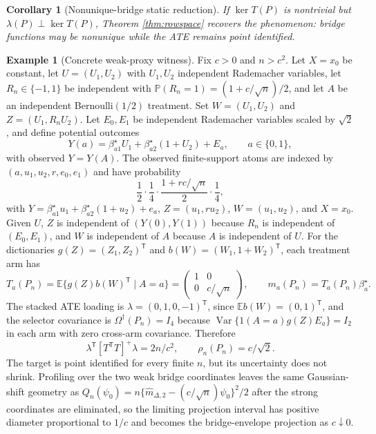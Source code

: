 \documentclass[11pt]{article}
\newcommand{\E}{\mathbb{E}}
\renewcommand{\Pr}{\mathbb{P}}
\newcommand{\transpose}{\mathsf{T}}
\theoremstyle{definition}
\newtheorem{example}{Example}
\theoremstyle{plain}
\newtheorem{corollary}{Corollary}
\theoremstyle{remark}
\begin{document}
\begin{corollary}[Nonunique-bridge static reduction]\label{cor:nonunique}
If $\ker T(P)$ is nontrivial but $\lambda(P)\perp\ker T(P)$, Theorem
\ref{thm:rowspace} recovers the \cite{ZhangLiMiaoTchetgen2023} phenomenon:
bridge functions may be nonunique while the ATE remains point identified.
\end{corollary}

\begin{example}[Concrete weak-proxy witness]\label{ex:witness}
Fix $c>0$ and $n>c^2$.  Let $X=x_0$ be constant, let
$U=(U_1,U_2)$ with $U_1,U_2$ independent Rademacher variables, let
$R_n\in\{-1,1\}$ be independent with
$\Pr(R_n=1)=(1+c/\sqrt n)/2$, and let $A$ be an independent Bernoulli$(1/2)$
treatment.  Set $W=(U_1,U_2)$ and $Z=(U_1,R_nU_2)$.  Let
$E_0,E_1$ be independent Rademacher variables scaled by $\sqrt 2$, and define
potential outcomes
\[
Y(a)=\beta_{a1}^\star U_1+\beta_{a2}^\star(1+U_2)+E_a,\qquad a\in\{0,1\},
\]
with observed $Y=Y(A)$.  The observed finite-support atoms are indexed by
$(a,u_1,u_2,r,e_0,e_1)$ and have probability
\[
\frac12\cdot\frac14\cdot\frac{1+r c/\sqrt n}{2}\cdot\frac14,
\]
with $Y=\beta_{a1}^\star u_1+\beta_{a2}^\star(1+u_2)+e_a$,
$Z=(u_1,ru_2)$, $W=(u_1,u_2)$, and $X=x_0$.
Given $U$, $Z$ is independent of $(Y(0),Y(1))$ because $R_n$ is independent of
$(E_0,E_1)$, and $W$ is independent of $A$ because $A$ is independent of $U$.
For the dictionaries $g(Z)=(Z_1,Z_2)^\transpose$ and
$b(W)=(W_1,1+W_2)^\transpose$, each treatment arm has
\[
T_a(P_n)=\E\{g(Z)b(W)^\transpose\mid A=a\}
=\begin{pmatrix}1&0\\0&c/\sqrt n\end{pmatrix},
\qquad
m_a(P_n)=T_a(P_n)\beta_a^\star .
\]
The stacked ATE loading is
$\lambda=(0,1,0,-1)^\transpose$, since
$\E b(W)=(0,1)^\transpose$, and the selector covariance is
$\Omega^\dagger(P_n)=I_4$ because
$\operatorname{Var}\{1(A=a)g(Z)E_a\}=I_2$ in each arm with zero cross-arm
covariance.  Therefore
\[
\lambda^\transpose[T^\transpose T]^+\lambda=2n/c^2,\qquad
\rho_n(P_n)=c/\sqrt2.
\]
The target is point identified for every finite $n$, but its uncertainty does
not shrink.  Profiling over the two weak bridge coordinates leaves the same
Gaussian-shift geometry as
$Q_n(\psi_0)=n\{\widehat m_{\Delta,2}-(c/\sqrt n)\psi_0\}^2/2$ after the
strong coordinates are eliminated, so the limiting projection interval has
positive diameter proportional to $1/c$ and becomes the bridge-envelope
projection as $c\downarrow0$.
\end{example}
\end{document}
